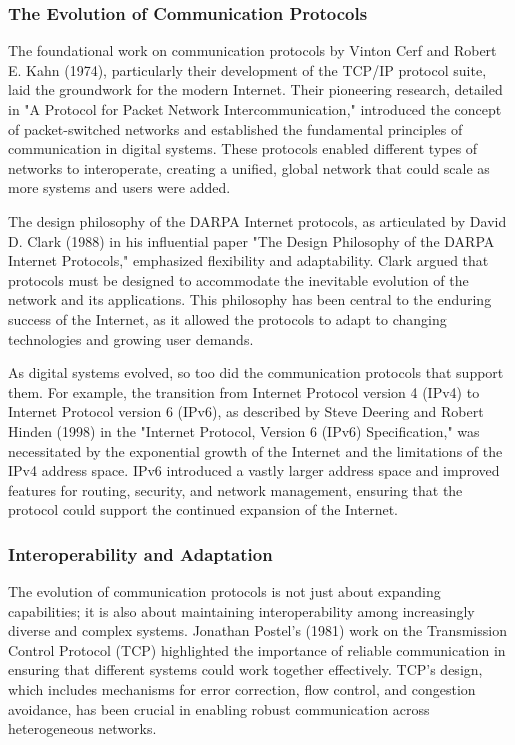 \documentclass[12pt,twoside]{article}
\begin{document}
\subsubsection{The Evolution of Communication Protocols}

The foundational work on communication protocols by Vinton Cerf and Robert E. Kahn (1974), particularly their development of the TCP/IP protocol suite, laid the groundwork for the modern Internet. Their pioneering research, detailed in "A Protocol for Packet Network Intercommunication," introduced the concept of packet-switched networks and established the fundamental principles of communication in digital systems. These protocols enabled different types of networks to interoperate, creating a unified, global network that could scale as more systems and users were added.

The design philosophy of the DARPA Internet protocols, as articulated by David D. Clark (1988) in his influential paper "The Design Philosophy of the DARPA Internet Protocols," emphasized flexibility and adaptability. Clark argued that protocols must be designed to accommodate the inevitable evolution of the network and its applications. This philosophy has been central to the enduring success of the Internet, as it allowed the protocols to adapt to changing technologies and growing user demands.

As digital systems evolved, so too did the communication protocols that support them. For example, the transition from Internet Protocol version 4 (IPv4) to Internet Protocol version 6 (IPv6), as described by Steve Deering and Robert Hinden (1998) in the "Internet Protocol, Version 6 (IPv6) Specification," was necessitated by the exponential growth of the Internet and the limitations of the IPv4 address space. IPv6 introduced a vastly larger address space and improved features for routing, security, and network management, ensuring that the protocol could support the continued expansion of the Internet.

\subsubsection{Interoperability and Adaptation}

The evolution of communication protocols is not just about expanding capabilities; it is also about maintaining interoperability among increasingly diverse and complex systems. Jonathan Postel’s (1981) work on the Transmission Control Protocol (TCP) highlighted the importance of reliable communication in ensuring that different systems could work together effectively. TCP's design, which includes mechanisms for error correction, flow control, and congestion avoidance, has been crucial in enabling robust communication across heterogeneous networks.
\end{document}
